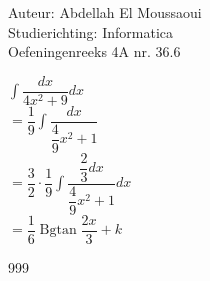 \documentclass[a4paper]{article}
\begin{document}
  
\noindent \large Auteur: Abdellah El Moussaoui \\
\noindent \large Studierichting: Informatica\\
\noindent \large Oefeningenreeks 4A nr. 36.6\\

\medskip

\normalsize

$\displaystyle\int \dfrac{dx}{4x^2+9}dx$\\

$= \dfrac{1}{9}\displaystyle\int \dfrac{dx}{\dfrac{4}{9}x^2+1}$\\

$= \dfrac{3}{2} \cdot \dfrac{1}{9}\displaystyle\int \dfrac{\dfrac{2}{3}dx}{\dfrac{4}{9}x^2+1}dx$\\

$= \dfrac{1}{6}\operatorname{Bgtan}\dfrac{2x}{3}+k$\\


\begin{thebibliography}{999}
\end{thebibliography}
\end{document}
